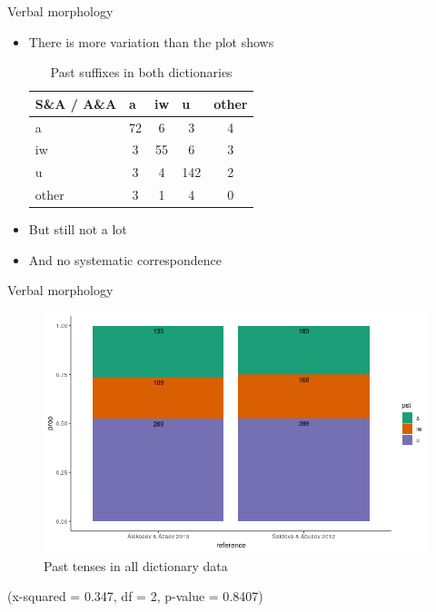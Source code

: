 \begin{frame}{Verbal morphology}

\begin{itemize}
    \item There is more variation than the plot shows

\begin{table}[]
\caption{Past suffixes in both dictionaries}
\label{tab:pstcorr}
\begin{tabular}{l|cccc}
S\&A / A\&A & \multicolumn{1}{l}{a} & \multicolumn{1}{l}{iw} & \multicolumn{1}{l}{u} & \multicolumn{1}{l}{other} \\ \hline
a           & 72                    & 6                      & 3                     & 4                         \\
iw          & 3                     & 55                     & 6                     & 3                         \\
u           & 3                     & 4                      & 142                   & 2                         \\
other       & 3                     & 1                      & 4                     & 0                        
\end{tabular}
\end{table}
\pause
\vfill
\item But still not a lot
\item And no systematic correspondence
\end{itemize}
\end{frame}

\begin{frame}{Verbal morphology}

\begin{figure}[h]
\centering
\caption{Past tenses in all dictionary data}
\includegraphics[scale=0.4]{images/pstfull.png}
\end{figure}

\small (x-squared = 0.347, df = 2, p-value = 0.8407) %

\end{frame}



